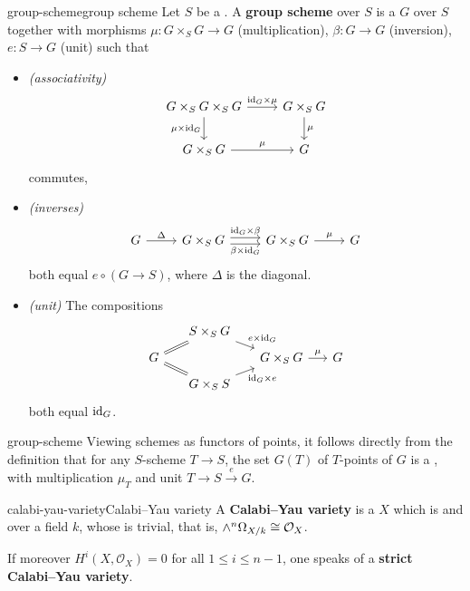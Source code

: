 \begin{topic}{group-scheme}{group scheme}
    Let $S$ be a . A \textbf{group scheme} over $S$ is a  $G$ over $S$ together with morphisms $\mu : G \times_S G \to G$ (multiplication), $\beta : G \to G$ (inversion), $e : S \to G$ (unit) such that
    \begin{itemize}
        \item \textit{(associativity)}
        \[ \begin{tikzcd}
            G \times_S G \times_S G \arrow{r}{\id_G \times \mu} \arrow[swap]{d}{\mu \times \id_G} & G \times_S G \arrow{d}{\mu} \\ G \times_S G \arrow{r}{\mu} & G
        \end{tikzcd} \]
        commutes,
        \item \textit{(inverses)}
        \[ \begin{tikzcd} G \arrow{r}{\Delta} & G \times_S G \arrow[shift left=0.25em]{r}{\id_G \times \beta} \arrow[swap, shift right=0.25em]{r}{\beta \times \id_G} & G \times_S G \arrow{r}{\mu} & G \end{tikzcd} \]
        both equal $e \circ (G \to S)$, where $\Delta$ is the diagonal.
        \item \textit{(unit)} The compositions
        \[ \begin{tikzcd}[row sep=0.5em, column sep=1.5em] & S \times_S G \arrow{dr}{e \times \id_G} & & \\ G \arrow[equal]{ur} \arrow[equal]{dr} & & G \times_S G \arrow{r}{\mu} & G \\ & G \times_S S \arrow[swap]{ur}{\id_G \times e} & & \end{tikzcd} \]
        both equal $\textup{id}_G$.
    \end{itemize}
\end{topic}

\begin{example}{group-scheme}
    Viewing schemes as functors of points, it follows directly from the definition that for any $S$-scheme $T \to S$, the set $G(T)$ of $T$-points of $G$ is a , with multiplication $\mu_T$ and unit $T \to S \xrightarrow{e} G$.
\end{example}

\begin{topic}{calabi-yau-variety}{Calabi--Yau variety}
    A \textbf{Calabi--Yau variety} is a  $X$ which is  and  over a field $k$, whose  is trivial, that is, $\wedge^n \Omega_{X/k} \cong \mathcal{O}_X$.
    
    If moreover $H^i(X, \mathcal{O}_X) = 0$ for all $1 \le i \le n - 1$, one speaks of a \textbf{strict Calabi--Yau variety}.
\end{topic}

